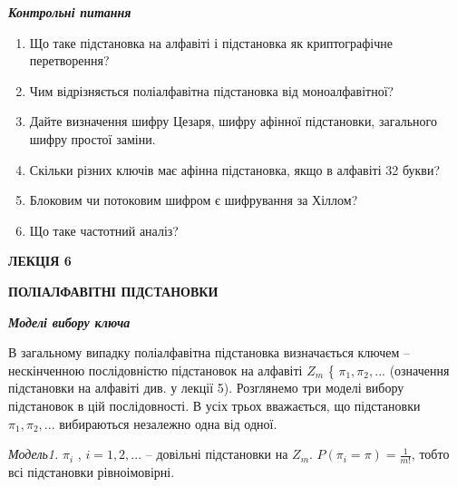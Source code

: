 \documentclass[a4paper]{article}
\newcommand\liststyleWWviiiNumxiv{%
\renewcommand\theenumi{\arabic{enumi}}
\renewcommand\theenumii{\alph{enumii}}
\renewcommand\theenumiii{\roman{enumiii}}
\renewcommand\theenumiv{\arabic{enumiv}}
\renewcommand\labelenumi{\theenumi.}
\renewcommand\labelenumii{\theenumii.}
\renewcommand\labelenumiii{\theenumiii.}
\renewcommand\labelenumiv{\theenumiv.}
}
\newcounter{}
\begin{document}
\bigskip


\bigskip


\bigskip

{\centering\bfseries\itshape
Контрольні питання
\par}


\bigskip

\liststyleWWviiiNumxiv
\begin{enumerate}
\item Що таке підстановка на алфавіті і підстановка як криптографічне
перетворення?
\item Чим відрізняється поліалфавітна підстановка від моноалфавітної?
\item Дайте визначення шифру Цезаря, шифру афінної підстановки, загального шифру
простої заміни.
\item Скільки різних ключів має афінна підстановка, якщо в алфавіті 32 букви?
\item Блоковим чи потоковим шифром є шифрування за Хіллом?
\item Що таке частотний аналіз?
\end{enumerate}

\bigskip


\bigskip


\bigskip

{\bfseries
ЛЕКЦІЯ  6}


\bigskip

{\centering\bfseries
ПОЛІАЛФАВІТНІ  ПІДСТАНОВКИ
\par}


\bigskip


\bigskip

{\centering\bfseries\itshape
Моделі вибору ключа
\par}


\bigskip


\bigskip

В загальному випадку поліалфавітна підстановка визначається ключем –
нескінченною послідовністю підстановок на алфавіті  ${Z_{{m}}}$ \{ ${\pi
_{{1}},\pi _{{2}},\text{.}\text{.}\text{.}}$ (означення підстановки на алфавіті
див. у лекції 5). Розглянемо три моделі вибору підстановок в цій послідовності.
В усіх трьох вважається, що підстановки  ${\pi _{{1}},\pi
_{{2}},\text{.}\text{.}\text{.}}$ вибираються незалежно одна від одної.

\textit{Модель1.  } ${\pi _{{i}}}$ ,  ${i=1,2,\text{.}\text{.}\text{.}}$ –
довільні підстановки на  ${Z_{{m}}}$.  ${P(\pi _{{i}}=\pi )=\frac{1}{m!}}$,
тобто всі підстановки рівноімовірні.
\end{document}
